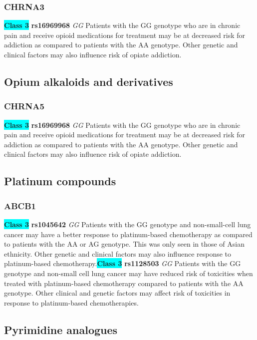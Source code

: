 \documentclass{book}
\begin{document}
\subsubsection{ CHRNA3 }

\begin{center}
\textbf{\colorbox{cyan} {Class 3}} \textbf{ rs16969968 } \textit{ GG }
Patients with the GG genotype who are in chronic pain and receive opioid medications for treatment may be at decreased risk for addiction as compared to patients with the AA genotype. Other genetic and clinical factors may also influence risk of opiate addiction.


\end{center}\subsection{ Opium alkaloids and derivatives }


\subsubsection{ CHRNA5 }

\begin{center}
\textbf{\colorbox{cyan} {Class 3}} \textbf{ rs16969968 } \textit{ GG }
Patients with the GG genotype who are in chronic pain and receive opioid medications for treatment may be at decreased risk for addiction as compared to patients with the AA genotype. Other genetic and clinical factors may also influence risk of opiate addiction.


\end{center}\subsection{ Platinum compounds }


\subsubsection{ ABCB1 }

\begin{center}
\textbf{\colorbox{cyan} {Class 3}} \textbf{ rs1045642 } \textit{ GG }
Patients with the GG genotype and non-small-cell lung cancer may have a better response to platinum-based chemotherapy as compared to patients with the AA or AG genotype. This was only seen in those of Asian ethnicity. Other genetic and clinical factors may also influence response to platinum-based chemotherapy.\textbf{\colorbox{cyan} {Class 3}} \textbf{ rs1128503 } \textit{ GG }
Patients with the GG genotype and non-small cell lung cancer may have reduced risk of toxicities when treated with platinum-based chemotherapy compared to patients with the AA genotype. Other clinical and genetic factors may affect risk of toxicities in response to platinum-based chemotherapies.


\end{center}\subsection{ Pyrimidine analogues }
\end{document}
